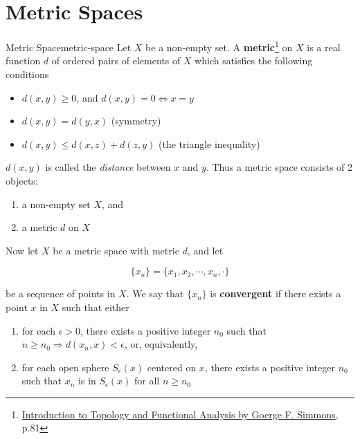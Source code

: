 \section{Metric Spaces}

\begin{Definition}{Metric Space}{metric-space}
    Let $X$ be a non-empty set. A \textbf{metric}\footnote{\href{https://trello.com/c/3EPccNTa}{Introduction to Topology and Functional Analysis by Goerge F. Simmons}, p.81}
    on $X$ is a real function $d$ of ordered pairs of elements of $X$ which satisfies the following conditions

    \begin{itemize}
        \item $d(x, y) \ge 0$, and $d(x, y) = 0 \iff x = y$
        \item $d(x, y) = d(y, x)$ (symmetry)
        \item $d(x, y) \le d(x, z) + d(z, y)$ (the triangle inequality)
    \end{itemize}
\end{Definition}

$d(x, y)$ is called the \textit{distance} between $x$ and $y$. Thus a metric space consists of 2 objects:

\begin{enumerate}
    \item a non-empty set $X$, and
    \item a metric $d$ on $X$
\end{enumerate}

Now let $X$ be a metric space with metric $d$, and let

\begin{equation}
    \{ x_n \} = \{ x_1, x_2, \cdots, x_n, \cdot \}
\end{equation}

be a sequence of points in $X$. We say that $\{ x_n \}$ is \textbf{convergent} if there exists a point $x$ in $X$ such
that either

\begin{enumerate}
    \item for each $\epsilon > 0$, there exists a positive integer $n_0$ such that $n \ge n_0 \Rightarrow d(x_n, x) < \epsilon$,
          or, equivalently,
    \item for each open sphere $S_{\epsilon}(x)$ centered on $x$, there exists a positive integer $n_0$ such that $x_n$
          is in $S_{\epsilon}(x)$ for all $n \ge n_0$
\end{enumerate}

